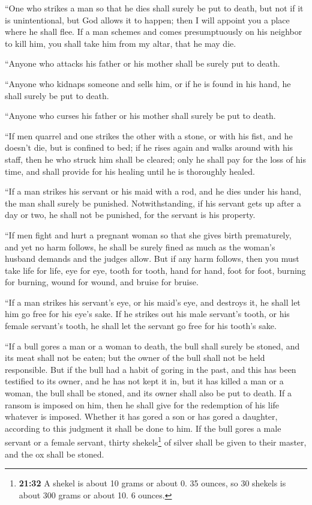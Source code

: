  ``One who strikes a man so that he dies shall surely be
put to death,  but not if it is unintentional, but God
allows it to happen; then I will appoint you a place where he shall
flee.  If a man schemes and comes presumptuously on his
neighbor to kill him, you shall take him from my altar, that he may die.

 ``Anyone who attacks his father or his mother shall be
surely put to death.

 ``Anyone who kidnaps someone and sells him, or if he is
found in his hand, he shall surely be put to death.

 ``Anyone who curses his father or his mother shall
surely be put to death.

 ``If men quarrel and one strikes the other with a stone,
or with his fist, and he doesn't die, but is confined to bed;
 if he rises again and walks around with his staff, then
he who struck him shall be cleared; only he shall pay for the loss of
his time, and shall provide for his healing until he is thoroughly
healed.

 ``If a man strikes his servant or his maid with a rod,
and he dies under his hand, the man shall surely be punished.
 Notwithstanding, if his servant gets up after a day or
two, he shall not be punished, for the servant is his property.

 ``If men fight and hurt a pregnant woman so that she
gives birth prematurely, and yet no harm follows, he shall be surely
fined as much as the woman's husband demands and the judges allow.
 But if any harm follows, then you must take life for
life,  eye for eye, tooth for tooth, hand for hand, foot
for foot,  burning for burning, wound for wound, and
bruise for bruise.

 ``If a man strikes his servant's eye, or his maid's eye,
and destroys it, he shall let him go free for his eye's sake.
 If he strikes out his male servant's tooth, or his
female servant's tooth, he shall let the servant go free for his tooth's
sake.

 ``If a bull gores a man or a woman to death, the bull
shall surely be stoned, and its meat shall not be eaten; but the owner
of the bull shall not be held responsible.  But if the
bull had a habit of goring in the past, and this has been testified to
its owner, and he has not kept it in, but it has killed a man or a
woman, the bull shall be stoned, and its owner shall also be put to
death.  If a ransom is imposed on him, then he shall give
for the redemption of his life whatever is imposed. 
Whether it has gored a son or has gored a daughter, according to this
judgment it shall be done to him.  If the bull gores a
male servant or a female servant, thirty shekels\footnote{\textbf{21:32}
  A shekel is about 10 grams or about 0. 35 ounces, so 30 shekels is
  about 300 grams or about 10. 6 ounces.} of silver shall be given to
their master, and the ox shall be stoned.

